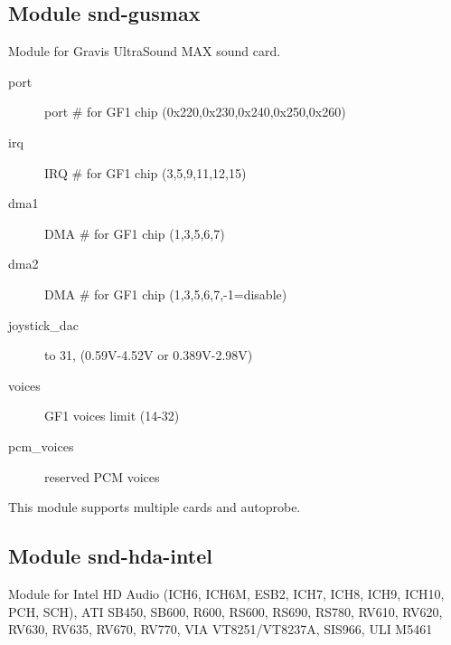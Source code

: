 \documentclass[a4paper,8pt,english]{sphinxmanual}
\begin{document}
\subsection{Module snd-gusmax}
\label{sound/alsa-configuration:module-snd-gusmax}
Module for Gravis UltraSound MAX sound card.
\begin{description}
\item[{port}] \leavevmode
port \# for GF1 chip (0x220,0x230,0x240,0x250,0x260)

\item[{irq}] \leavevmode
IRQ \# for GF1 chip (3,5,9,11,12,15)

\item[{dma1}] \leavevmode
DMA \# for GF1 chip (1,3,5,6,7)

\item[{dma2}] \leavevmode
DMA \# for GF1 chip (1,3,5,6,7,-1=disable)

\item[{joystick\_dac}]  to 31, (0.59V-4.52V or 0.389V-2.98V)

\item[{voices}] \leavevmode
GF1 voices limit (14-32)

\item[{pcm\_voices}] \leavevmode
reserved PCM voices

\end{description}

This module supports multiple cards and autoprobe.


\subsection{Module snd-hda-intel}
\label{sound/alsa-configuration:module-snd-hda-intel}
Module for Intel HD Audio (ICH6, ICH6M, ESB2, ICH7, ICH8, ICH9, ICH10,
PCH, SCH), ATI SB450, SB600, R600, RS600, RS690, RS780, RV610, RV620,
RV630, RV635, RV670, RV770, VIA VT8251/VT8237A, SIS966, ULI M5461
\end{document}
